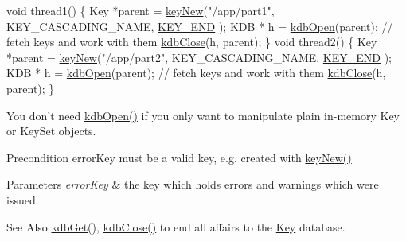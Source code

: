 \begin{DoxyCodeInclude}
\textcolor{keywordtype}{void} thread1()
\{
        Key *parent = \hyperlink{group__key_gad23c65b44bf48d773759e1f9a4d43b89}{keyNew}(\textcolor{stringliteral}{"/app/part1"}, KEY\_CASCADING\_NAME, \hyperlink{group__key_gga91fb3178848bd682000958089abbaf40aa8adb6fcb92dec58fb19410eacfdd403}{KEY\_END}
      );
        KDB * h = \hyperlink{group__kdb_ga6808defe5870f328dd17910aacbdc6ca}{kdbOpen}(parent);
        \textcolor{comment}{// fetch keys and work with them}
        \hyperlink{group__kdb_gadb54dc9fda17ee07deb9444df745c96f}{kdbClose}(h, parent);
\}
\textcolor{keywordtype}{void} thread2()
\{
        Key *parent = \hyperlink{group__key_gad23c65b44bf48d773759e1f9a4d43b89}{keyNew}(\textcolor{stringliteral}{"/app/part2"}, KEY\_CASCADING\_NAME, \hyperlink{group__key_gga91fb3178848bd682000958089abbaf40aa8adb6fcb92dec58fb19410eacfdd403}{KEY\_END}
      );
        KDB * h = \hyperlink{group__kdb_ga6808defe5870f328dd17910aacbdc6ca}{kdbOpen}(parent);
        \textcolor{comment}{// fetch keys and work with them}
        \hyperlink{group__kdb_gadb54dc9fda17ee07deb9444df745c96f}{kdbClose}(h, parent);
\}
\end{DoxyCodeInclude}
 You don't need \hyperlink{group__kdb_ga6808defe5870f328dd17910aacbdc6ca}{kdb\-Open()} if you only want to manipulate plain in-\/memory Key or Key\-Set objects.

\begin{DoxyPrecond}{Precondition}
error\-Key must be a valid key, e.\-g. created with \hyperlink{group__key_gad23c65b44bf48d773759e1f9a4d43b89}{key\-New()}
\end{DoxyPrecond}

\begin{DoxyParams}{Parameters}
{\em error\-Key} & the key which holds errors and warnings which were issued \\
\hline
\end{DoxyParams}
\begin{DoxySeeAlso}{See Also}
\hyperlink{group__kdb_ga28e385fd9cb7ccfe0b2f1ed2f62453a1}{kdb\-Get()}, \hyperlink{group__kdb_gadb54dc9fda17ee07deb9444df745c96f}{kdb\-Close()} to end all affairs to the \hyperlink{group__key}{Key} database. 
\end{DoxySeeAlso}

